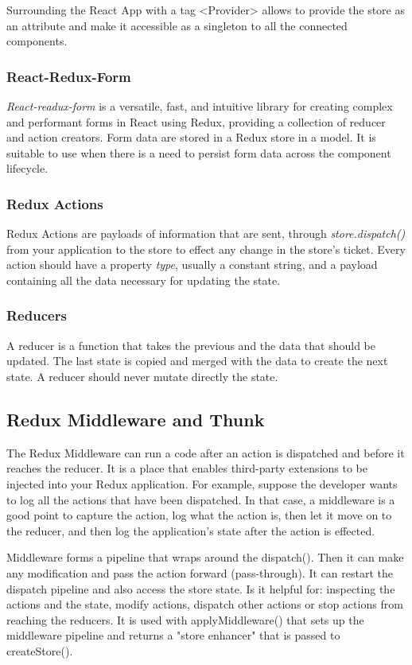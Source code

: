Surrounding the React App with a tag <Provider> allows to provide the store as an attribute and make it accessible as a singleton to all the connected components.

\subsubsection*{React-Redux-Form}\textit{React-readux-form} is a versatile, fast, and intuitive library for creating complex and performant forms in React using Redux, providing a collection of reducer and action creators. Form data are stored in a Redux store in a model. It is suitable to use when there is a need to persist form data across the component lifecycle.

\subsubsection*{Redux Actions}
Redux Actions are payloads of information that are sent, through \textit{store.dispatch()} from your application to the store to effect any change in the store's ticket. Every action should have a property \textit{type}, usually a constant string, and a payload containing all the data necessary for updating the state.

\subsubsection*{Reducers}
A reducer is a function that takes the previous and the data that should be updated. The last state is copied and merged with the data to create the next state. A reducer should never mutate directly the state.

\subsection*{Redux Middleware and Thunk}
The Redux Middleware can run a code after an action is dispatched and before it reaches the reducer. It is a place that enables third-party extensions to be injected into your Redux application. For example, suppose the developer wants to log all the actions that have been dispatched. In that case, a middleware is a good point to capture the action, log what the action is, then let it move on to the reducer, and then log the application's state after the action is effected.

Middleware forms a pipeline that wraps around the dispatch(). Then it can make any modification and pass the action forward (pass-through). It can restart the dispatch pipeline and also access the store state.
Is it helpful for: inspecting the actions and the state, modify actions, dispatch other actions or stop actions from reaching the reducers.
It is used with applyMiddleware() that sets up the middleware pipeline and returns a "store enhancer" that is passed to createStore().

